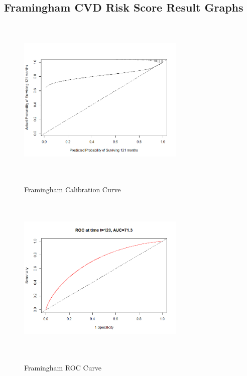 \documentclass[a4paper,12pt]{article}
\begin{document}
\begin{appendices}
   			\subsection{Framingham CVD Risk Score Result Graphs}
	   		\begin{figure}[H]
	   			\begin{minipage}{.45\linewidth}
	   				\includegraphics[width=8cm, height=8cm]{prelim-results/FSRS/FSRScal.png}
	   				\label{Fram1}
	   				\captionsetup{justification=justified,singlelinecheck=false,margin=1cm}
	   				\caption{Framingham Calibration Curve}
	   			\end{minipage}
	   			\hspace{.01\linewidth}
	   			\begin{minipage}{.45\linewidth}
	   				\includegraphics[width=8cm, height=8cm]{prelim-results/FSRS/FSRSdisc.png}
	   				\label{Fram2}
	   				\captionsetup{justification=justified,singlelinecheck=false,margin=1cm}
	   				\caption{Framingham ROC Curve}
	   			\end{minipage}
	   		\end{figure}
   		

\end{appendices}
\end{document}
